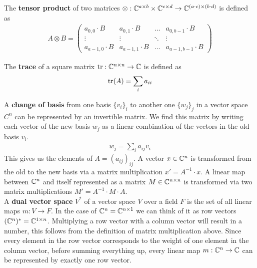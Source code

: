 
The \textbf{tensor product} of two matrices $\otimes: \mathbb{C}^{a \times b} \times \mathbb{C}^{c \times d} \to \mathbb{C}^{(a \cdot c) \times (b \cdot d)}$ is defined as
\begin{align}
    A \otimes B = \begin{pmatrix}
        a_{0, 0} \cdot B & a_{0, 1} \cdot B & \ldots & a_{0, b-1} \cdot B \\
        \vdots & \vdots & \ddots & \vdots \\
        a_{a-1, 0} \cdot B & a_{a-1, 1} \cdot B & \ldots & a_{a-1, b-1} \cdot B
    \end{pmatrix}
\end{align}


The \textbf{trace} of a square matrix $\operatorname{tr}: \mathbb{C}^{n \times n} \to \mathbb{C}$ is defined as
\begin{align}
    \operatorname{tr}(A) = \sum_i a_{ii}
\end{align}

A \textbf{change of basis} from one basis $\{v_i\}_i$ to another one $\{w_j\}_j$ in a vector space $C^n$ can be represented by an invertible matrix.
We find this matrix by writing each vector of the new basis $w_j$ as a linear combination of the vectors in the old basis $v_i$.
\begin{align}
    w_j = \sum_i a_{ij} v_i
\end{align}
This gives us the elements of $A = (a_{ij})_{ij}$.
A vector $x \in \mathbb{C}^n$ is transformed from the old to the new basis via a matrix multiplication $x' = A^{-1} \cdot x$.
A linear map between $\mathbb{C}^n$ and itself represented as a matrix $M \in \mathbb{C}^{n \times n}$ is transformed via two matrix multiplications $M' = A^{-1} \cdot M \cdot A$.
\\

A \textbf{dual vector space} $V^*$ of a vector space $V$ over a field $F$ is the set of all linear maps $m: V \to F$.
In the case of $\mathbb{C}^n = \mathbb{C}^{n \times 1}$ we can think of it as row vectors $(\mathbb{C}^n)^* = \mathbb{C}^{1 \times n}$.
Multiplying a row vector with a column vector will result in a number, this follows from the definition of matrix multiplication above.
Since every element in the row vector corresponds to the weight of one element in the column vector, before summing everything up, every linear map $m: \mathbb{C}^n \to \mathbb{C}$ can be represented by exactly one row vector.
